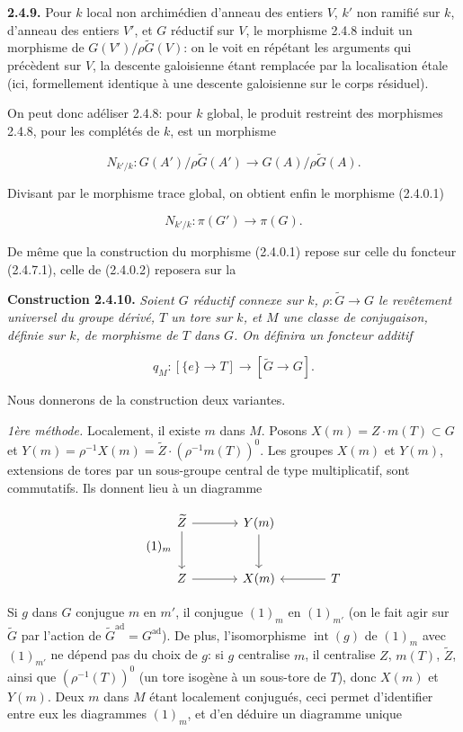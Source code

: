 \documentclass[10pt,a4paper]{article}
\newcommand{\SourcePage}[2]{\clearpage\setcounter{page}{#2}\typeout{D031_SOURCE_PAGE physical=#1 printed=#2}}
\begin{document}
\textbf{2.4.9.} Pour \(k\) local non archimédien d'anneau des entiers \(V\), \(k'\) non ramifié sur \(k\), d'anneau des entiers \(V'\), et \(G\) réductif sur \(V\), le morphisme 2.4.8 induit un morphisme de \(G(V')/\rho\widetilde G(V)\): on le voit en répétant les arguments qui précèdent sur \(V\), la descente galoisienne étant remplacée par la localisation étale (ici, formellement identique à une descente galoisienne sur le corps résiduel).

On peut donc adéliser 2.4.8: pour \(k\) global, le produit restreint des morphismes 2.4.8, pour les complétés de \(k\), est un morphisme

\[
N_{k'/k}:G(A')/\rho\widetilde G(A')\longrightarrow G(A)/\rho\widetilde G(A).
\]

\SourcePage{32}{278}
Divisant par le morphisme trace global, on obtient enfin le morphisme (2.4.0.1)

\[
N_{k'/k}:\pi(G')\longrightarrow\pi(G).
\]

De même que la construction du morphisme (2.4.0.1) repose sur celle du foncteur (2.4.7.1), celle de (2.4.0.2) reposera sur la

\textbf{Construction 2.4.10.} \emph{Soient \(G\) réductif connexe sur \(k\), \(\rho:\widetilde G\to G\) le revêtement universel du groupe dérivé, \(T\) un tore sur \(k\), et \(M\) une classe de conjugaison, définie sur \(k\), de morphisme de \(T\) dans \(G\). On définira un foncteur additif}

\[
q_M:[\{e\}\longrightarrow T]\longrightarrow[\widetilde G\longrightarrow G].
\]

Nous donnerons de la construction deux variantes.

\emph{1ère méthode.} Localement, il existe \(m\) dans \(M\). Posons \(X(m)=Z\cdot m(T)\subset G\) et \(Y(m)=\rho^{-1}X(m)=\widetilde Z\cdot(\rho^{-1}m(T))^0\). Les groupes \(X(m)\) et \(Y(m)\), extensions de tores par un sous-groupe central de type multiplicatif, sont commutatifs. Ils donnent lieu à un diagramme

\[
\tag*{\((1)_m\)}
\begin{tikzcd}[column sep=large,row sep=large]
\widetilde Z \arrow[r] \arrow[d] & Y(m) \arrow[d] \\
Z \arrow[r] & X(m) & T \arrow[l]
\end{tikzcd}
\]

Si \(g\) dans \(G\) conjugue \(m\) en \(m'\), il conjugue \((1)_m\) en \((1)_{m'}\) (on le fait agir sur \(\widetilde G\) par l'action de \(\widetilde G^{\mathrm{ad}}=G^{\mathrm{ad}}\)). De plus, l'isomorphisme \(\operatorname{int}(g)\) de \((1)_m\) avec \((1)_{m'}\) ne dépend pas du choix de \(g\): si \(g\) centralise \(m\), il centralise \(Z\), \(m(T)\), \(\widetilde Z\), ainsi que \((\rho^{-1}(T))^0\) (un tore isogène à un sous-tore de \(T\)), donc \(X(m)\) et \(Y(m)\). Deux \(m\) dans \(M\) étant localement conjugués, ceci permet d'identifier entre eux les diagrammes \((1)_m\), et d'en déduire un diagramme unique
\end{document}
